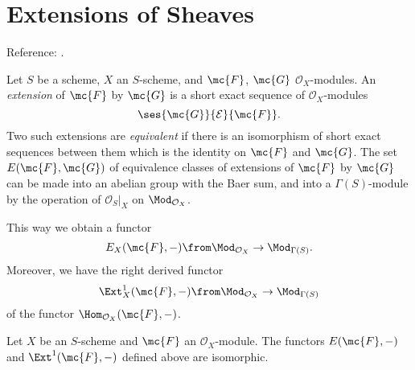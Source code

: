 \section{Extensions of Sheaves}

Reference: \cite[Example 2.1.12]{huybrechts-lehn-sheaves}.

Let $S$ be a scheme, $X$ an $S$-scheme, and $\mc{F}$, $\mc{G}$ $\mathcal{O}_X$-modules. An \emph{extension} of $\mc{F}$ by $\mc{G}$ is a short exact sequence of $\mathcal{O}_X$-modules
\[
	\ses{\mc{G}}{\mathcal{E}}{\mc{F}}.
\]
Two such extensions are \emph{equivalent} if there is an isomorphism of short exact sequences between them which is the identity on $\mc{F}$ and $\mc{G}$. The set $E(\mc{F},\mc{G})$ of equivalence classes of extensions of $\mc{F}$ by $\mc{G}$ can be made into an abelian group with the Baer sum, and into a $\Gamma(S)$-module by the operation of $\mathcal{O}_S |_X$ on $\Mod_{\mathcal{O}_X}$.

This way we obtain a functor
\[
	E_X(\mc{F},-) \from \Mod_{\mathcal{O}_X} \to \Mod_{\Gamma(S)}.
\]
Moreover, we have the right derived functor
\[
	\Ext^1_X(\mc{F},-) \from \Mod_{\mathcal{O}_X} \to \Mod_{\Gamma(S)}
\]
of the functor $\Hom_{\mathcal{O}_X}(\mc{F},-)$.

\begin{proposition}
	Let $X$ be an $S$-scheme and $\mc{F}$ an $\mathcal{O}_X$-module. The functors $E(\mc{F},-)$ and $\Ext^1(\mc{F},-)$ defined above are isomorphic.
\end{proposition}